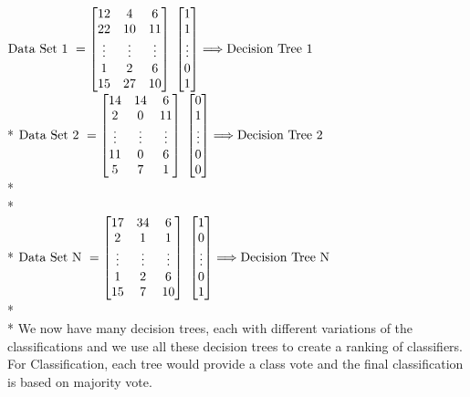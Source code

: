 $\textup{Data Set 1 }= \begin{bmatrix}
12 & 4 & 6  \\
22 & 10  & 11 \\
\vdots & \vdots & \vdots \\
1 & 2 & 6  \\
15 & 27  & 10
\end{bmatrix}$
$\begin{bmatrix}
\textup{1} \\
\textup{1} \\
\vdots \\
\textup{0} \\
\textup{1} 
\end{bmatrix} \Longrightarrow \textup{Decision Tree 1} $ \\*
$\textup{Data Set 2 }= \begin{bmatrix}
14 & 14 & 6  \\
2 & 0  & 11 \\
\vdots & \vdots & \vdots \\
11 & 0 & 6  \\
5 & 7  & 1
\end{bmatrix}$
$\begin{bmatrix}
\textup{0} \\
\textup{1} \\
\vdots \\
\textup{0} \\
\textup{0} 
\end{bmatrix}  \Longrightarrow \textup{Decision Tree 2}$
\\*\\*\\*
$\textup{Data Set N }= \begin{bmatrix}
17 & 34 & 6  \\
2 & 1  & 1 \\
\vdots & \vdots & \vdots \\
1 & 2 & 6  \\
15 & 7  & 10
\end{bmatrix}$
$\begin{bmatrix}
\textup{1} \\
\textup{0} \\
\vdots \\
\textup{0} \\
\textup{1} 
\end{bmatrix}  \Longrightarrow \textup{Decision Tree N}$
\\*\\*
We now have many decision trees, each with different variations of the classifications and we use all these decision trees to create a ranking of classifiers. For Classification, each tree would provide a class vote and the final classification is based on majority vote. 
